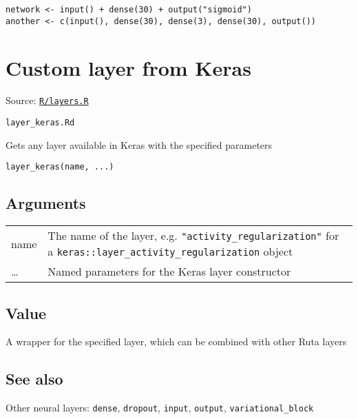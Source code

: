 \begin{verbatim}
network <- input() + dense(30) + output("sigmoid")
another <- c(input(), dense(30), dense(3), dense(30), output())
\end{verbatim}

\section{Custom layer from Keras}\label{custom-layer-from-keras}

Source:
\href{https://github.com/fdavidcl/ruta/blob/master/R/layers.R}{\texttt{R/layers.R}}

\texttt{layer\_keras.Rd}

Gets any layer available in Keras with the specified parameters

\begin{verbatim}
layer_keras(name, ...)
\end{verbatim}

\hypertarget{arguments}{\subsection{\texorpdfstring{\protect\hyperlink{arguments}{}Arguments}{Arguments}}\label{arguments}}

\begin{longtable}[c]{@{}ll@{}}
\toprule
name & The name of the layer, e.g. \texttt{"activity\_regularization"}
for a \texttt{keras::layer\_activity\_regularization}
object\tabularnewline
\ldots{} & Named parameters for the Keras layer
constructor\tabularnewline
\bottomrule
\end{longtable}

\hypertarget{value}{\subsection{\texorpdfstring{\protect\hyperlink{value}{}Value}{Value}}\label{value}}

A wrapper for the specified layer, which can be combined with other Ruta
layers

\hypertarget{see-also}{\subsection{\texorpdfstring{\protect\hyperlink{see-also}{}See
also}{See also}}\label{see-also}}

Other neural layers: \texttt{dense}, \texttt{dropout}, \texttt{input},
\texttt{output}, \texttt{variational\_block}

